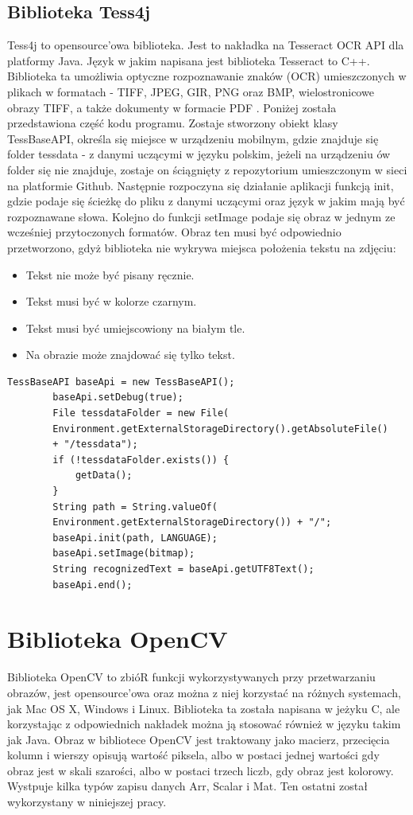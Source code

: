 \documentclass[eng,oneside]{mgr}
\begin{document}
\subsection{Biblioteka Tess4j}
Tess4j to opensource'owa biblioteka. Jest to nakładka na Tesseract OCR API dla platformy Java. Język w jakim napisana jest biblioteka Tesseract to C++. Biblioteka ta umożliwia optyczne rozpoznawanie znaków (OCR) umieszczonych w plikach w formatach - TIFF, JPEG, GIR, PNG oraz BMP, wielostronicowe obrazy TIFF, a także dokumenty w formacie PDF \cite{tess4j}.
Poniżej została przedstawiona część kodu programu. Zostaje stworzony obiekt klasy TessBaseAPI, określa się miejsce w urządzeniu mobilnym, gdzie znajduje się folder tessdata - z danymi uczącymi w języku polskim, jeżeli na urządzeniu ów folder się nie znajduje, zostaje on ściągnięty z repozytorium umieszczonym w sieci na platformie Github. Następnie rozpoczyna się działanie aplikacji funkcją init, gdzie podaje się ścieżkę do pliku z danymi uczącymi oraz język w jakim mają być rozpoznawane słowa. Kolejno do funkcji setImage podaje się obraz w jednym ze wcześniej przytoczonych formatów. Obraz ten musi być odpowiednio przetworzono, gdyż biblioteka nie wykrywa miejsca położenia tekstu na zdjęciu:
\begin{itemize}
\item Tekst nie może być pisany ręcznie.
\item Tekst musi być w kolorze czarnym.
\item Tekst musi być umiejscowiony na białym tle.
\item Na obrazie może znajdować się tylko tekst.
\end{itemize}

\begin{lstlisting}[caption={Kod programu, odpowiadający za odwołanie  do zewnętrznego API Tess4j}]
	TessBaseAPI baseApi = new TessBaseAPI();
        baseApi.setDebug(true);
        File tessdataFolder = new File(
        Environment.getExternalStorageDirectory().getAbsoluteFile() 
        + "/tessdata");
        if (!tessdataFolder.exists()) {
            getData();
        }
        String path = String.valueOf(
        Environment.getExternalStorageDirectory()) + "/";
        baseApi.init(path, LANGUAGE);
        baseApi.setImage(bitmap);
        String recognizedText = baseApi.getUTF8Text();
        baseApi.end();
\end{lstlisting}
\section{Biblioteka OpenCV}
Biblioteka OpenCV to zbióR funkcji wykorzystywanych przy przetwarzaniu obrazów, jest opensource'owa oraz można z niej korzystać na różnych systemach, jak Mac OS X, Windows i Linux. Biblioteka ta została napisana w jeżyku C, ale korzystając z odpowiednich nakładek można ją stosować również w języku takim jak Java.
Obraz w bibliotece OpenCV jest traktowany jako macierz, przecięcia kolumn i wierszy opisują wartość piksela, albo w postaci jednej wartości gdy obraz jest w skali szarości, albo w postaci trzech liczb, gdy obraz jest kolorowy. Wystpuje kilka typów zapisu danych Arr, Scalar i Mat. Ten ostatni został wykorzystany w niniejszej pracy\cite{opencv}.
\end{document}
